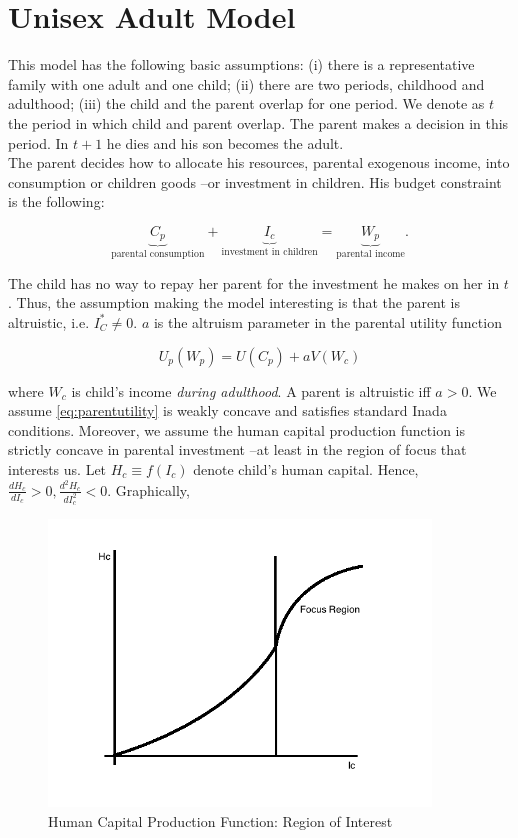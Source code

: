 \section{Unisex Adult Model} \label{sec:unisex}

\noindent This model has the following basic assumptions: (i) there is a representative family with one adult and one child; (ii) there are two periods, childhood and adulthood; (iii) the child and the parent overlap for one period. We denote as $t$ the period in which child and parent overlap. The parent makes a decision in this period. In $t+1$ he dies and his son becomes the adult.\\
\indent The parent decides how to allocate his resources, parental exogenous income, into consumption or children goods --or investment in children. His budget constraint is the following: 

\begin{equation}
\underbrace{C_{p}}_{\text{parental consumption}} + \underbrace{I_{c}}_{\text{investment in children}} = \underbrace{W_{p}}_{\text{parental income}}.
\end{equation}

\indent The child has no way to repay her parent for the investment he makes on her in $t$. Thus, the assumption making the model interesting is that the parent is altruistic, i.e. $I_{C}^* \neq 0$. $a$ is the altruism parameter in the parental utility function

\begin{equation}
U_{p} (W_{p}) = U(C_{p}) + a V (W_{c}) \label{eq:parentutility}
\end{equation}

\noindent where $W_{c}$ is child's income \textit{during adulthood}. A parent is altruistic iff $a > 0$. We assume  \eqref{eq:parentutility} is weakly concave and satisfies standard Inada conditions. Moreover, we assume the human capital production function is strictly concave in parental investment --at least in the region of focus that interests us. Let $H_{c} \equiv f(I_{c})$ denote child's human capital. Hence, $\frac{d H_{c}}{ d I_{c}} > 0, \frac{d^2 H_{c}}{ d I_{c}^2} < 0$. Graphically,

\begin{center}
\begin{figure}[H] 
\caption{Human Capital Production Function: Region of Interest}
\centering
\includegraphics[width=4in, height=3in]{Plots/FocusRegion.png}
\end{figure}
\end{center}

